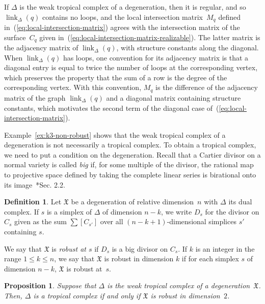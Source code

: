 \documentclass[11pt,reqno]{amsart}
\newtheorem{prop}[thm]{Proposition}
\theoremstyle{definition}
\newtheorem{defn}[thm]{Definition}
\newcommand{\defi}[1]{\emph{#1}}
\newcommand{\link}{\operatorname{link}}
\newcommand{\X}{\mathfrak X}
\begin{document}
If $\Delta$ is the weak tropical complex of a degeneration, then it is regular,
and so $\link_\Delta(q)$ contains no loops, and the local intersection
matrix~$M_q$ defined in~(\ref{eq:local-intersection-matrix}) agrees with the
intersection matrix of the surface~$C_q$ given
in~(\ref{eq:local-intersection-matrix-realizable}). The latter matrix is the
adjacency matrix of $\link_\Delta(q)$, with structure constants along the
diagonal. When $\link_\Delta(q)$ has loops, one convention for its
adjacency matrix is that a diagonal entry is equal to twice the number of loops
at the corresponding vertex,
which preserves the property that the sum of a row is the degree of
the corresponding vertex.
With this convention, $M_q$ is the difference
of the adjacency matrix of the graph $\link_\Delta(q)$ and a diagonal matrix
containing structure constants, which motivates the second term of the
diagonal case of~(\ref{eq:local-intersection-matrix}).

Example~\ref{ex:k3-non-robust} shows that the weak tropical complex of a 
degeneration is not necessarily a tropical complex. To obtain a tropical
complex, we need to put a condition on the degeneration. Recall that a Cartier
divisor on a normal variety is called \defi{big} if, for some multiple of the
divisor, the rational map to projective space defined by taking the complete
linear series is birational onto its image~\cite{lazarsfeld}*{Sec. 2.2}.

\begin{defn}\label{d:robust}
Let $\X$ be a degeneration of relative dimension~$n$ with $\Delta$ its
dual complex. If $s$ is a simplex of $\Delta$ of dimension $n-k$, we write $D_s$
for the divisor on $C_s$ given as the sum $\sum [C_{s'}]$  over all
$(n-k+1)$-dimensional simplices $s'$ containing $s$.

We say that $\X$ is \defi{robust at $s$} if $D_s$ is a big divisor on $C_s$. If
$k$ is an integer in the range $1 \leq k \leq n$, we say that $\X$ is robust in
dimension $k$ if for each simplex $s$ of dimension $n-k$, $\X$ is robust at~$s$.
\end{defn}

\begin{prop}\label{p:tropical-complex-robustness}
Suppose that $\Delta$ is the weak tropical complex of a 
degeneration~$\X$. Then, $\Delta$ is a tropical complex if and only if $\X$ is
robust in dimension~$2$.
\end{prop}
\end{document}
